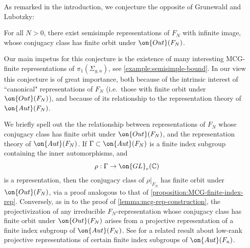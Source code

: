 As remarked in the introduction, we conjecture the opposite of Grunewald and Lubotzky:
\begin{conjecture}
\notready
	\label{conjecture:infinite-image-semisimple}
For all $N>0$, there exist semisimple representations of $F_N$ with infinite image, whose conjugacy class has finite orbit under $\on{Out}(F_N)$.
\end{conjecture}
Our main impetus for this conjecture is the existence of many interesting
MCG-finite representations of $\pi_1(\Sigma_{g,n})$, see \autoref{example:semisimple-bound}. In our view this conjecture is of great importance, both because of the intrinsic interest of ``canonical" representations of $F_N$ (i.e.~those with finite orbit under $\on{Out}(F_N)$), and because of its relationship to the representation theory of $\on{Aut}(F_N)$.

\begin{remark}
\notready
We briefly spell out the the relationship between representations of $F_N$ whose conjugacy class has finite orbit under $\on{Out}(F_N)$, and the representation theory of
$\on{Aut}(F_N)$.
If $\Gamma\subset \on{Aut}(F_N)$ is a finite index subgroup containing the inner automorphisms, and
$$\rho:\Gamma\to \on{GL}_r(\mathbb{C})$$ is a representation, then the conjugacy
class of $\rho|_{F_N}$ has finite orbit under $\on{Out}(F_N)$, via a proof
analogous to that of
\autoref{proposition:MCG-finite-index-rep}. Conversely, as in to the proof of \autoref{lemma:mcg-rep-construction}, the projectivization of any irreducible $F_N$-representation whose conjugacy class has finite orbit under $\on{Out}(F_N)$ arises from a projective representation of a finite index subgroup of $\on{Aut}(F_N)$. See \cite[Theorem 7.12]{baumeister-kielak-pierro} for a related result about low-rank projective representations of certain finite index subgroups of $\on{Aut}(F_n)$.
\end{remark}
